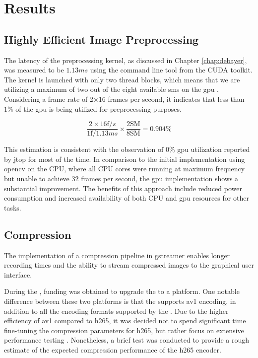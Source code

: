 \chapter{Results}
\label{chap:results}

\section{Highly Efficient Image Preprocessing}
The latency of the preprocessing kernel, as discussed in Chapter \ref{chap:debayer}, was measured to be $1.13ms$ using the  command line tool from the CUDA toolkit. The kernel is launched with only two thread blocks, which means that we are utilizing a maximum of two out of the eight available \glspl{sm} on the \gls{gpu} \cite{rigerunNVIDIAJetsonXavier2023}. Considering a frame rate of 2$\times$16 frames per second, it indicates that less than $1\%$ of the \gls{gpu} is being utilized for preprocessing purposes.

\begin{equation}
    \frac{2 \times 16 \text{f}/s}{1 \text{f} / 1.13ms} \times \frac{2 \text{SM}}{8 \text{SM}} = 0.904\%
\end{equation}


This estimation is consistent with the observation of $0\%$ \gls{gpu} utilization reported by \gls{jtop} for most of the time. In comparison to the initial implementation using \gls{opencv} on the CPU, where all CPU cores were running at maximum frequency but unable to achieve 32 frames per second, the \gls{gpu} implementation shows a substantial improvement. The benefits of this approach include reduced power consumption and increased availability of both CPU and \gls{gpu} resources for other tasks.

\section{Compression}
The implementation of a compression pipeline in \gls{gstreamer} enables longer recording times and the ability to stream compressed images to the graphical user interface.

During the \master, funding was obtained to upgrade the \jx to a \jo platform.
One notable difference between these two platforms is that the \jo supports \gls{av1} encoding, in addition to all the encoding formats supported by the \jx \cite{karumbunathanNVIDIAJetsonAGX2022}.
Due to the higher efficiency of \gls{av1} compared to \gls{h265}, it was decided not to spend significant time fine-tuning the compression parameters for \gls{h265}, but rather focus on extensive performance testing \cite{torresAV1VsHEVC2022}.
Nonetheless, a brief test was conducted to provide a rough estimate of the expected compression performance of the \gls{h265} encoder.

